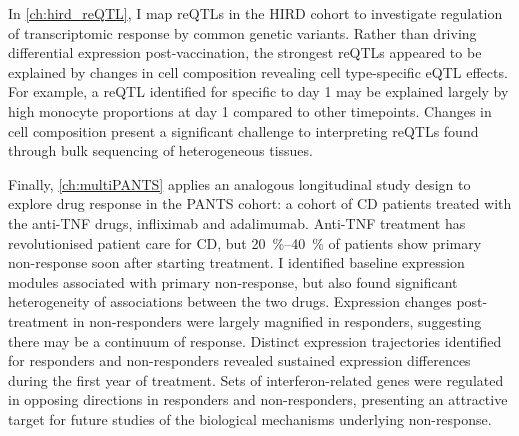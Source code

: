 In \cref{ch:hird_reQTL}, I map \glspl{reQTL} in the \gls{HIRD} cohort to investigate regulation of transcriptomic response by common genetic variants.
Rather than driving differential expression post-vaccination,
the strongest \glspl{reQTL} appeared to be explained by changes in cell composition revealing cell type-specific \gls{eQTL} effects.
For example, a \gls{reQTL} identified for  specific to day 1 may be explained largely by high monocyte proportions at day 1 compared to other timepoints.
Changes in cell composition present a significant challenge to interpreting \glspl{reQTL} found through bulk sequencing of heterogeneous tissues.

Finally, \cref{ch:multiPANTS} applies an analogous longitudinal study design to explore drug response in the \gls{PANTS} cohort:
a cohort of \gls{CD} patients treated with the anti-\gls{TNF} drugs, infliximab and adalimumab.
Anti-\gls{TNF} treatment has revolutionised patient care for \gls{CD},
but \SIrange{20}{40}{\percent} of patients show primary non-response soon after starting treatment.
I identified baseline expression modules associated with primary non-response, but also found significant heterogeneity of associations between the two drugs.
Expression changes post-treatment in non-responders were largely magnified in responders, suggesting there may be a continuum of response.
Distinct expression trajectories identified for responders and non-responders revealed sustained expression differences during the first year of treatment.
Sets of interferon-related genes were regulated in opposing directions in responders and non-responders,
presenting an attractive target for future studies of the biological mechanisms underlying non-response.
%
